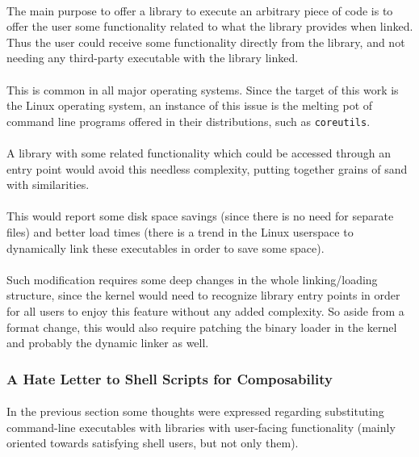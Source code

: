 \documentclass[12pt]{article}
\begin{document}
	\paragraph{}The main purpose to offer a library to execute an arbitrary piece of code is to offer the user some functionality related to what the library provides when linked. Thus the user could receive some functionality directly from the library, and not needing any third-party executable with the library linked.
	\paragraph{}This is common in all major operating systems. Since the target of this work is the Linux operating system, an instance of this issue is the melting pot of command line programs offered in their distributions, such as \verb|coreutils|. 
	\paragraph{}A library with some related functionality which could be accessed through an entry point would avoid this needless complexity, putting together grains of sand with similarities.
	\paragraph{}This would report some disk space savings (since there is no need for separate files) and better load times (there is a trend in the Linux userspace to dynamically link these executables in order to save some space).
	\paragraph{}Such modification requires some deep changes in the whole linking/loading structure, since the kernel would need to recognize library entry points in order for all users to enjoy this feature without any added complexity.  So aside from a format change, this would also require patching the binary loader in the kernel and probably the dynamic linker as well.
	
	\subsubsection{A Hate Letter to Shell Scripts for Composability}
	
	\paragraph{}In the previous section some thoughts were expressed regarding substituting command-line executables with libraries with user-facing functionality (mainly oriented towards satisfying shell users, but not only them).
\end{document}

